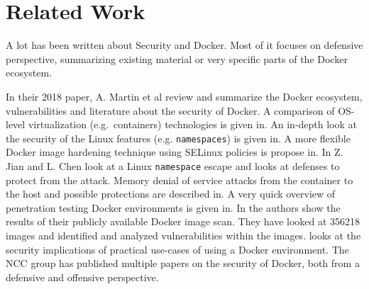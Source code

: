 \chapter{Related Work}


A lot has been written about Security and Docker. Most of it focuses on defensive perspective, summarizing existing material or very specific parts of the Docker ecosystem.

In their 2018 paper, A. Martin et al review and summarize the Docker ecosystem, vulnerabilities and literature about the security of Docker\cite{Docker-Ecosystem-Vulnerability-Analysis}. A comparison of OS-level virtualization (e.g.\ containers) technologies is given in\cite{Security-OS-level-Virtualization}. An in-depth look at the security of the Linux features (e.g. \lstinline{namespaces}) is given in\cite{Analysis-Docker-Security}. A more flexible Docker image hardening technique using SELinux policies is propose in\cite{DockerPolicyModules}. In\cite{Defense-Docker-Escape} Z. Jian and L. Chen look at a Linux \lstinline{namespace} escape and looks at defenses to protect from the attack. Memory denial of service attacks from the container to the host and possible protections are described in\cite{Securing-Docker-Containers-from-DOS}. A very quick overview of penetration testing Docker environments is given in\cite{Research-Pentesting-Docker-Environment}. In\cite{Study-Vulnerabilities-Docker-Hub} the authors show the results of their publicly available Docker image scan. They have looked at 356218 images and identified and analyzed vulnerabilities within the images.\cite{To-Docker-Not-To-Docker} looks at the security implications of practical use-cases of using a Docker environment. The NCC group has published multiple papers on the security of Docker, both from a defensive\cite{Understanding-and-Hardening-Linux-Containers} and offensive\cite{Abusing-Containers} perspective.
